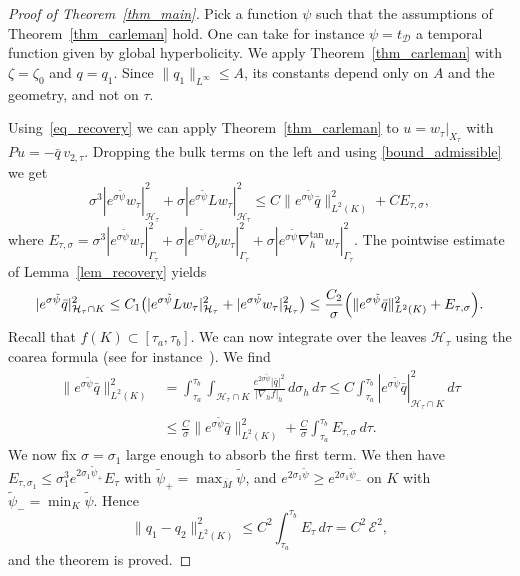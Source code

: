 \documentclass[12pt,reqno]{amsart}
\numberwithin{equation}{section}
\theoremstyle{definition}
\theoremstyle{plain}
\theoremstyle{definition}
\theoremstyle{definition}
\newcommand{\Ht}{\mathcal{H}_{\tau}}
\newcommand{\uu}{M}
\begin{document}
\begin{proof}[Proof of Theorem~\ref{thm_main}]
Pick a function $\psi$ such that the assumptions of Theorem~\ref{thm_carleman} hold. One can take for instance $\psi=t_\mathcal{D}$ a temporal function given by global hyperbolicity. We apply Theorem~\ref{thm_carleman} with $\zeta=\zeta_0$ and $q=q_1$. Since $\|q_1\|_{L^\infty}\le A$, its constants depend only on $A$ and the geometry, and not on $\tau$.


Using~\eqref{eq_recovery} we can apply Theorem~\ref{thm_carleman} to $u=w_\tau|_{X_\tau}$ with $Pu=-\bar q\,v_{2,\tau}$. Dropping the bulk terms on the left and using \eqref{bound_admissible} we get
\[
\sigma^3|e^{\sigma\tilde\psi}w_\tau|^2_{\Ht}+\sigma|e^{\sigma\tilde\psi}Lw_\tau|^2_{\Ht}\le C\|e^{\sigma\tilde\psi}\bar q\|^2_{L^2(K)}+C E_{\tau,\sigma},
\]
where $E_{\tau,\sigma}=\sigma^3|e^{\sigma\tilde\psi}w_\tau|^2_{\Gamma_\tau}+\sigma|e^{\sigma\tilde\psi}\partial_\nu w_\tau|^2_{\Gamma_\tau}+\sigma|e^{\sigma\tilde\psi}\nabla_h^{\tan}w_\tau|^2_{\Gamma_\tau}$. The pointwise estimate of Lemma~\ref{lem_recovery} yields
\[
|e^{\sigma\tilde\psi}\bar q|^2_{\Ht\cap K}\le C_1\bigl(|e^{\sigma\tilde\psi}Lw_\tau|^2_{\Ht}+|e^{\sigma\tilde\psi}w_\tau|^2_{\Ht}\bigr)\le\frac{C_2}{\sigma}\Bigl(\|e^{\sigma\tilde\psi}\bar q\|^2_{L^2(K)}+ E_{\tau,\sigma}\Bigr).
\]
Recall that $f(K) \subset[\tau_a,\tau_b]$. We can now integrate over the leaves $\mathcal H_\tau$ using the coarea formula (see for instance~\cite[Section 3.4]{evans2015}). We find
\begin{align*}
\|e^{\sigma\tilde\psi}\bar q\|^2_{L^2(K)}&=\int_{\tau_a}^{\tau_b}\!\!\int_{\Ht\cap K}\frac{e^{2\sigma\tilde\psi}|\bar q|^2}{|\nabla_hf|_h}\,d\sigma_h\,d\tau\le C \int_{\tau_a}^{\tau_b}|e^{\sigma\tilde\psi}\bar q|^2_{\Ht\cap K}\,d\tau\\
&\le\frac{C}{\sigma}\|e^{\sigma\tilde\psi}\bar q\|^2_{L^2(K)}+\frac{C}{\sigma}\int_{\tau_a}^{\tau_b}E_{\tau,\sigma}\,d\tau .
\end{align*}
We now fix $\sigma=\sigma_1$ large enough to absorb the first term. We then have $E_{\tau,\sigma_1}\le\sigma_1^3e^{2\sigma_1\tilde\psi_+}E_\tau$ with $\tilde\psi_+=\max_{\overline\uu}\tilde\psi$, and $e^{2\sigma_1\tilde\psi}\ge e^{2\sigma_1\tilde\psi_-}$ on $K$ with $\tilde\psi_-=\min_K\tilde\psi$. Hence
\[
\|q_1-q_2\|^2_{L^2(K)}\le C ^2\int_{\tau_a}^{\tau_b}E_\tau\,d\tau=C^2\,\mathcal E^2,
\]
and the theorem is proved.
\end{proof}
\end{document}
